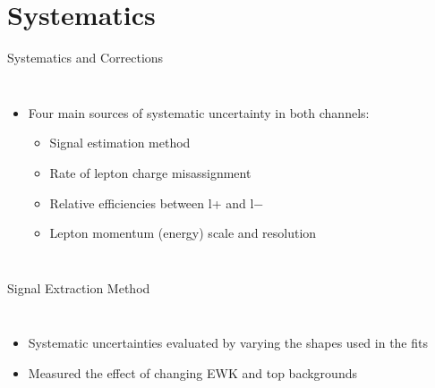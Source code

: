 \documentclass[t, 8pt]{beamer}
\begin{document}
\section{Systematics}

\begin{frame}{Systematics and Corrections}
  \begin{columns}[c]
  \begin{itemize}
    \item Four main sources of systematic uncertainty in both channels:
    \begin{itemize}
      \item Signal estimation method
      \item Rate of lepton charge misassignment
      \item Relative efficiencies between l+ and l−
      \item Lepton momentum (energy) scale and resolution
    \end{itemize}
  \end{itemize}
  \end{columns}
\end{frame}

\begin{frame}{Signal Extraction Method}
  \begin{columns}[c]
  \begin{itemize}
    \item Systematic uncertainties evaluated by varying the shapes used in the fits
    \item Measured the effect of changing EWK and top backgrounds
  \end{itemize}
  \end{columns}
\end{frame}
\end{document}
